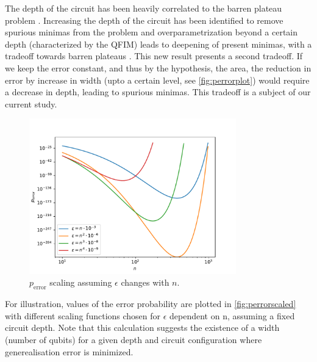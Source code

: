 The depth of the circuit has been heavily correlated to the barren plateau
problem \cite{larocca2021theory}. Increasing the depth of the circuit has been
identified to remove spurious minimas from the problem and overparametrization
beyond a certain depth (characterized by the QFIM) leads to deepening of present
minimas, with a tradeoff towards barren plateaus \cite{larocca2021diagnosing}.
This new result presents a second tradeoff. If we keep the error constant, and
thus by the hypothesis, the area, the reduction in error by increase in width
(upto a certain level, see \autoref{fig:perrorplot}) would require a decrease in
depth, leading to spurious minimas. This tradeoff is a subject of our current
study.

\begin{figure}[ht]
    \centering
    \includegraphics[width=0.8\textwidth]{figures/perrorscaled.pdf}
    \caption{\(p_{\text{error}}\) scaling assuming \(\epsilon\) changes with \(n\).}
    \label{fig:perrorscaled}
\end{figure}

For illustration, values of the error probability are plotted in
\autoref{fig:perrorscaled} with different scaling functions chosen for
\(\epsilon\) dependent on n, assuming a fixed circuit depth. Note that this
calculation suggests the existence of a width (number of qubits) for a given
depth and circuit configuration where generealisation error is minimized.
